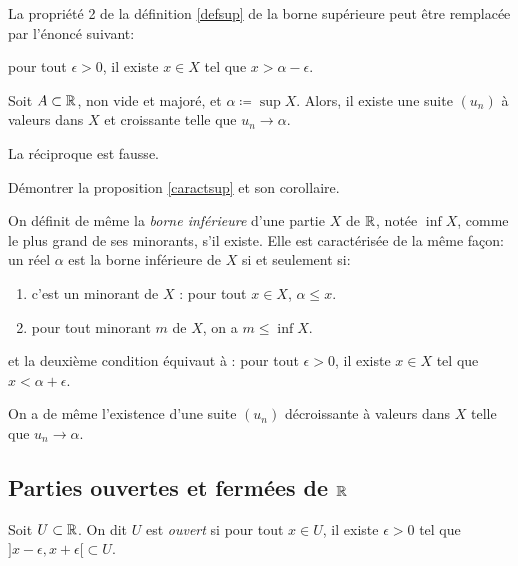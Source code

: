 \documentclass[../main.tex]{subfiles}
\begin{document}
\begin{prop} \label{caractsup}
    La propriété 2 de la définition \ref{defsup} de la borne supérieure peut être remplacée par l'énoncé suivant:
    
    \textup{pour tout $\epsilon > 0$, il existe $x\in X$ tel que $x>\alpha - \epsilon$.}
\end{prop}

\begin{cor}
    Soit $A\subset\mathbb R$, non vide et majoré, et $\alpha \coloneqq \sup X$. Alors, il existe une suite $(u_n)$ à valeurs dans $X$ et croissante telle que $u_n\longrightarrow \alpha$.
\end{cor}

\begin{rem}
	La réciproque est fausse.
\end{rem}

\begin{exo}[M]
    Démontrer la proposition \ref{caractsup} et son corollaire.
\end{exo}

\begin{mydef}\label{definf}
	On définit de même la \textit{borne inférieure} d'une partie $X$ de $\mathbb R$, notée $\inf X$, comme le plus grand de ses minorants, s'il existe. Elle est caractérisée de la même façon: un réel $\alpha$ est la borne inférieure de $X$ si et seulement si:\begin{enumerate}
		\item c'est un minorant de $X$ : pour tout $x\in X$, $\alpha \leq x$.
		\item pour tout minorant $m$ de $X$, on a $m\leq\inf X$.
	\end{enumerate}
	et la deuxième condition équivaut à : pour tout $\epsilon>0$, il existe $x\in X$ tel que $x<\alpha + \epsilon$.
\end{mydef}

On a de même l'existence d'une suite $(u_n)$ décroissante à valeurs dans $X$ telle que $u_n\longrightarrow \alpha$.

\subsection{Parties ouvertes et fermées de $\mathbb R$}

\begin{mydef}[Ouvert]
	Soit $U\subset\mathbb R$. On dit $U$ est \textit{ouvert} si pour tout $x\in U$, il existe $\epsilon > 0$ tel que ${]x-\epsilon,x+\epsilon[}\subset U$.
\end{mydef}
\end{document}
